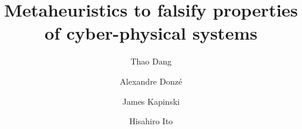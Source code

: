 \documentclass[sigconf]{acmart}
\title{Metaheuristics to falsify properties of cyber-physical systems}
\author{Thao Dang}
\affiliation{%
  \institution{Verimag, France}
}
\author{Alexandre Donz{\'{e}}}
\affiliation{%
  \institution{Decyphir, France}
}
\author{James Kapinski}
\affiliation{%
  \institution{Toyota Research Institute - North America}
}
\author{Hisahiro Ito}
\affiliation{%
  \institution{Toyota Research Institute - North America}
}
\date{}
\begin{document}
\begin{abstract}

\end{abstract}

\maketitle


\iffalse
\begin{outline}[enumerate]
\1 Introduction
	\2 The challenge of falsification
	\2 Falsification generally and via STL for CPS
	\2 Coverage
	\2 Metaheuristics in optimization
	\2 Overview of our approach
\1 Preliminaries: \emph{For much of the notation, we can reuse the notation from the CAV paper with Arvind, as it provides a way to introduce STL, robustness, and falsification but then quickly move to a general global optimization setting.}
	\2 General notation
		\3 $\Pi$ is a set of global optimization solvers
		\3 For a given solver $\pi\in \Pi$, $\Theta$ is a set of solver \emph{configurations}
		\3 $J$ is a cost evaluation
		\3 $x(t)$ is a trace of the system
	\2 Falsification
	\2 STL
		\3 $\varphi$ is an STL property 
		\3 $\rho$ maps a trace and an STL formula to a real number
	\2 Coverage
		\3 $H$ takes a collection of points and maps it to a real number representing the \emph{coverage} of the space points.
\1 Method
	\2 Monitoring robustness and coverage across iterations
	\2 Changing solver based on heuristic rules, informed by robustness and coverage
	\2 F-Race for tuning parameters
\1 Experiments
\1 Conclusions
\end{outline}
\fi









 
\end{document}
